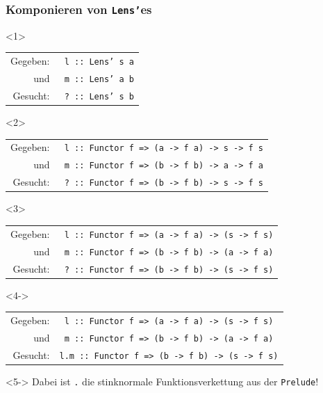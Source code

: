 \documentclass{beamer}
\newcommand{\hask}[1]{\texttt{#1}} %
\begin{document}
\begin{frame}[fragile]
  \frametitle{Komponieren von \hask{Lens'}es}
  \begin{onlyenv}<1>
    \begin{tabular}{r l}
      Gegeben: & \texttt{ l  :: Lens' s a} \\
      und & \texttt{ m  :: Lens' a b} \\[0.4em]
      Gesucht: & \texttt{ ?  :: Lens' s b}
    \end{tabular}
  \end{onlyenv}
  \begin{onlyenv}<2>
    \begin{tabular}{r l}
      Gegeben: & \texttt{ l  :: Functor f => (a -> f a) ->  s -> f s} \\
      und & \texttt{ m  :: Functor f => (b -> f b) ->  a -> f a} \\[0.4em]
      Gesucht: & \texttt{ ?  :: Functor f => (b -> f b) ->  s -> f s}
    \end{tabular}
  \end{onlyenv}
  \begin{onlyenv}<3>
    \begin{tabular}{r l}
      Gegeben: & \texttt{ l  :: Functor f => (a -> f a) -> (s -> f s)} \\
      und & \texttt{ m  :: Functor f => (b -> f b) -> (a -> f a)} \\[0.4em]
      Gesucht: & \texttt{ ?  :: Functor f => (b -> f b) -> (s -> f s)}
    \end{tabular}
  \end{onlyenv}
  \begin{onlyenv}<4->
    \begin{tabular}{r l}
      Gegeben: & \texttt{ l  :: Functor f => (a -> f a) -> (s -> f s)} \\
      und & \texttt{ m  :: Functor f => (b -> f b) -> (a -> f a)} \\[0.4em]
      Gesucht: & \texttt{l.m :: Functor f => (b -> f b) -> (s -> f s)}
    \end{tabular}
  \end{onlyenv}

  \begin{visibleenv}<5->
    \vspace{1em}
    Dabei ist \hask{.} die stinknormale Funktionsverkettung aus der \hask{Prelude}!
    \vspace{1em}
  \end{visibleenv}


\end{frame}
\end{document}
